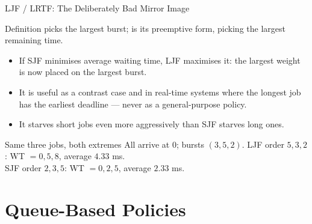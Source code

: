 \documentclass[aspectratio=169]{beamer}
\begin{document}
\begin{frame}{LJF / LRTF: The Deliberately Bad Mirror Image}
  \begin{block}{Definition}
     picks the largest burst;  is its
    preemptive form, picking the largest remaining time.
  \end{block}
  \begin{itemize}
    \item If SJF minimises average waiting time, LJF maximises it: the
      largest weight is now placed on the largest burst.
    \item It is useful as a contrast case and in real-time systems where the
      longest job has the earliest deadline --- never as a general-purpose
      policy.
    \item It starves short jobs even more aggressively than SJF starves long
      ones.
  \end{itemize}
  \vspace{0.1cm}
  \begin{exampleblock}{Same three jobs, both extremes}
    All arrive at 0; bursts $(3,5,2)$.
    LJF order $5,3,2$: WT $=0,5,8$, average $4.33$ ms.\\
    SJF order $2,3,5$: WT $=0,2,5$, average $2.33$ ms.
  \end{exampleblock}
\end{frame}


\section{Queue-Based Policies}
\end{document}
